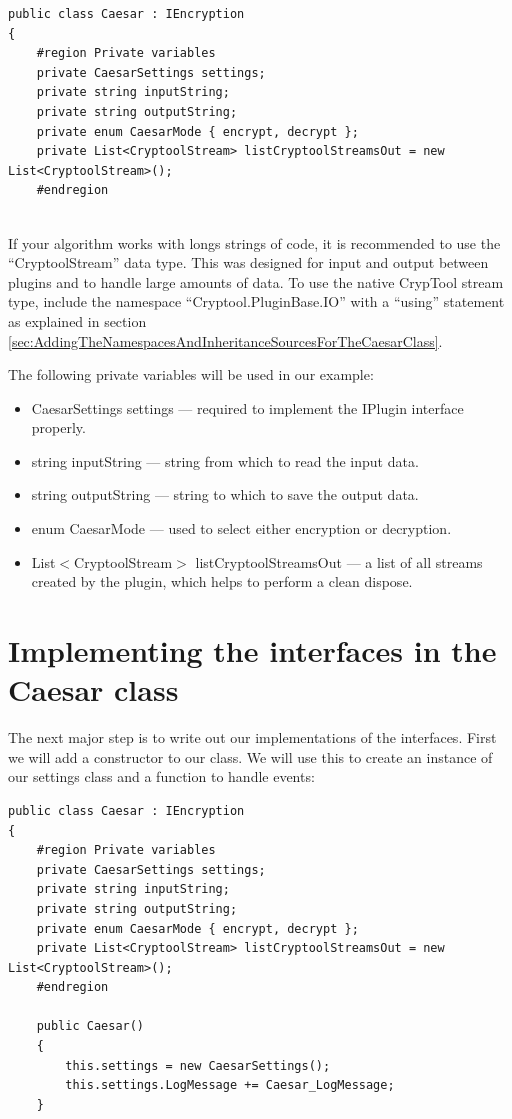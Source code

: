 \begin{lstlisting}
public class Caesar : IEncryption
{
	#region Private variables
	private CaesarSettings settings;
	private string inputString;
	private string outputString;
	private enum CaesarMode { encrypt, decrypt };
	private List<CryptoolStream> listCryptoolStreamsOut = new List<CryptoolStream>();
	#endregion
\end{lstlisting}

\ \\ %
If your algorithm works with longs strings of code, it is recommended to use the ``CryptoolStream'' data type. This was designed for input and output between plugins and to handle large amounts of data. To use the native CrypTool stream type, include the namespace ``Cryptool.PluginBase.IO'' with a ``using'' statement as explained in section \ref{sec:AddingTheNamespacesAndInheritanceSourcesForTheCaesarClass}.

The following private variables will be used in our example:

\begin{itemize}
	\item CaesarSettings settings --- required to implement the IPlugin interface properly.
	\item string inputString --- string from which to read the input data.
	\item string outputString --- string to which to save the output data.
	\item enum CaesarMode --- used to select either encryption or decryption.
	\item List$<$CryptoolStream$>$ listCryptoolStreamsOut --- a list of all streams created by the plugin, which helps to perform a clean dispose.
\end{itemize}

\section{Implementing the interfaces in the Caesar class}
\label{sec:ImplementingTheInterfacesInTheCaesarClass}

The next major step is to write out our implementations of the interfaces. First we will add a constructor to our class. We will use this to create an instance of our settings class and a function to handle events:

\begin{lstlisting}
public class Caesar : IEncryption
{
	#region Private variables
	private CaesarSettings settings;
	private string inputString;
	private string outputString;
	private enum CaesarMode { encrypt, decrypt };
	private List<CryptoolStream> listCryptoolStreamsOut = new List<CryptoolStream>();
	#endregion
	
	public Caesar()
	{
		this.settings = new CaesarSettings();
		this.settings.LogMessage += Caesar_LogMessage;
	}
\end{lstlisting}

